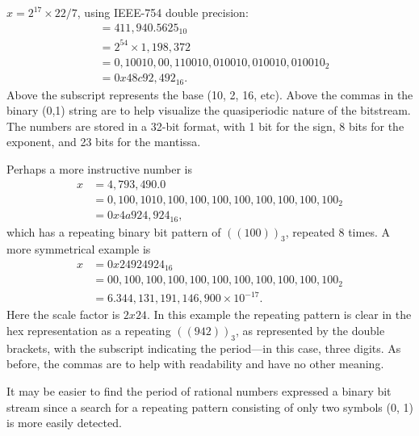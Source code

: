 \documentclass{ximera}
\begin{document}
 \label{eq:IEEE-754}
 

\BEx
$x=2^{17}\times 22/7$, using IEEE-754 double precision:%
 \begin{align*}
 	&=411,940.5625_{10}  \\
	&= 2^{54} \times 1,198,372 \\
	&= 0,10010,00,110010,010010,010010,010010_2 \\
	 &= 0x48c92,492_{16}.
 \end{align*}
 Above the subscript represents the base (10, 2, 16, etc).
Above the commas in the binary (0,1) string are to help visualize the quasiperiodic nature of the bitstream. 
The numbers are stored in a 32-bit format, with 1 bit for the sign, 8 bits for the exponent, and 23 bits for the mantissa.

Perhaps a more instructive number is
 \begin{align*}
 x&=4,793,490.0\\
 &= 0,100,1010,100,100,100,100,100,100,100,100_{2}\\
 &= 0x4a924,924_{16},
 \end{align*}
which has a repeating binary bit pattern of $((100))_{3}$, repeated 8 times. %
A more symmetrical example is
 \begin{align*}
x &= 0x24924924_{16} \\
&= 00,100,100,100,100,100,100,100,100,100,100_{2} \\
&= 6.344,131,191,146,900 \times 10^{-17}.
 \end{align*}
Here the scale factor is $2x24$. In this example
the repeating pattern is clear in the hex representation as a repeating $((942))_{3}$, as
represented by the double brackets, with the subscript indicating the period---in this case, three digits. 
As before, the commas are to help with readability and have no other meaning.
\EEx


It may be easier to find the period of rational numbers expressed a binary bit stream since a search
for a repeating pattern consisting of only two symbols (0, 1) is more easily detected.
\end{document}
